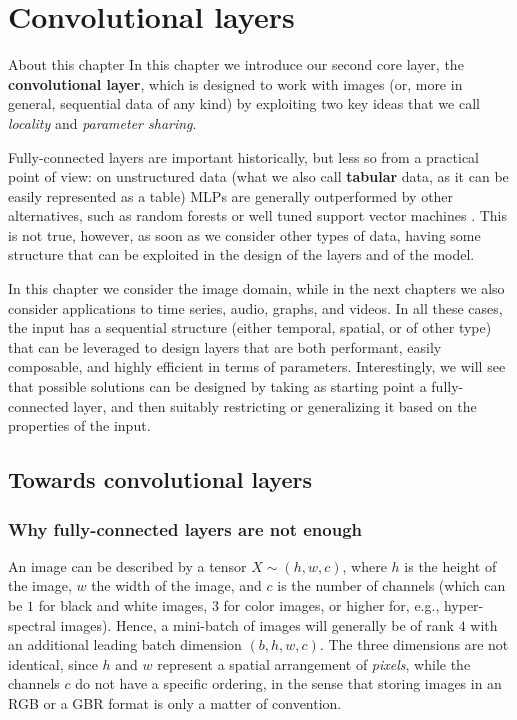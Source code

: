 \chapter{Convolutional layers}
\label{chap:cnns}

\begin{supportbox}{About this chapter}
In this chapter we introduce our second core layer, the \textbf{convolutional layer}, which is designed to work with images (or, more in general, sequential data of any kind) by exploiting two  key ideas that we call \textit{locality} and \textit{parameter sharing}.
\end{supportbox}

Fully-connected layers are important historically, but less so from a practical point of view: on unstructured data (what we also call \textbf{tabular} data, as it can be easily represented as a table) MLPs are generally outperformed by other alternatives, such as random forests or well tuned support vector machines \cite{grinsztajn2022tree}. This is not true, however, as soon as we consider other types of data, having some structure that can be exploited in the design of the layers and of the model.

In this chapter we  consider the image domain, while in the next chapters we also consider applications to time series, audio, graphs, and videos. In all these cases, the input has a sequential structure (either temporal, spatial, or of other type) that can be leveraged to design layers that are both performant, easily composable, and highly efficient in terms of parameters. Interestingly, we will see that possible solutions can be designed by taking as starting point a fully-connected layer, and then suitably restricting or generalizing it based on the properties of the input.
%
\section{Towards convolutional layers}
\label{sec:towards_convolutive_layers}
%
\subsection{Why fully-connected layers are not enough}
%
An image can be described by a tensor $X \sim(h,w,c)$, where $h$ is the height of the image, $w$ the width of the image, and $c$ is the number of channels (which can be $1$ for black and white images, $3$ for color images, or higher for, e.g., hyper-spectral images). Hence, a mini-batch of images will generally be of rank $4$ with an additional leading batch dimension $(b, h, w, c)$. The three dimensions are not identical, since $h$ and $w$ represent a spatial arrangement of \textit{pixels}, while the channels $c$ do not have a specific ordering, in the sense that storing images in an RGB or a GBR format is only a matter of convention. 

